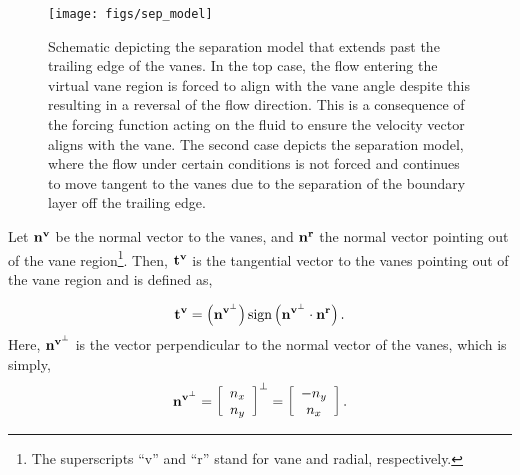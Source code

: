 \begin{figure}[!htb]
  \begin{center}
    \texttt{[image: figs/sep\_model]}
    \caption{Schematic depicting the separation model that extends past
   the trailing edge of the vanes. In the top case, the flow entering
   the virtual vane region is forced to align with the vane angle despite
   this resulting in a reversal of the flow direction. This is a
   consequence of the forcing function acting on the fluid to ensure the
   velocity vector aligns with the vane. 
   The second case depicts the separation
   model, where the flow under certain conditions is not forced and
   continues to move tangent to the vanes due to 
   the separation of the boundary layer off the trailing edge.} 
    \label{fig:sep_model}
  \end{center}
\end{figure}

Let $\bf n^v$ be the normal vector to the vanes,
and $\bf n^r$ the normal vector pointing out of the vane
region\footnote{\normalsize The superscripts ``v'' and ``r'' stand for
vane and radial, respectively.}.  
Then, $\bf t^v$ is the tangential vector to the vanes pointing out of
the vane region and is defined as,

\begin{equation}
 \bf t^v = \left( {\bf n^{v^\perp}} \right) \text{sign}\left(
	    {\bf n^{v^\perp}} \cdot {\bf n^r} \right).
\end{equation}
Here, ${\bf n^{v^\perp}}$ is the vector perpendicular to the normal
vector of the vanes, which is simply, 
\begin{equation*}
 {\bf n^{v^\perp}} = \left[ \begin{array}{c}
n_x\\
n_y\\
\end{array}\right]^{\perp} = 
 \left[ \begin{array}{c}
  -n_y\\
  n_x\\
	\end{array}\right].
\end{equation*}

%
%


